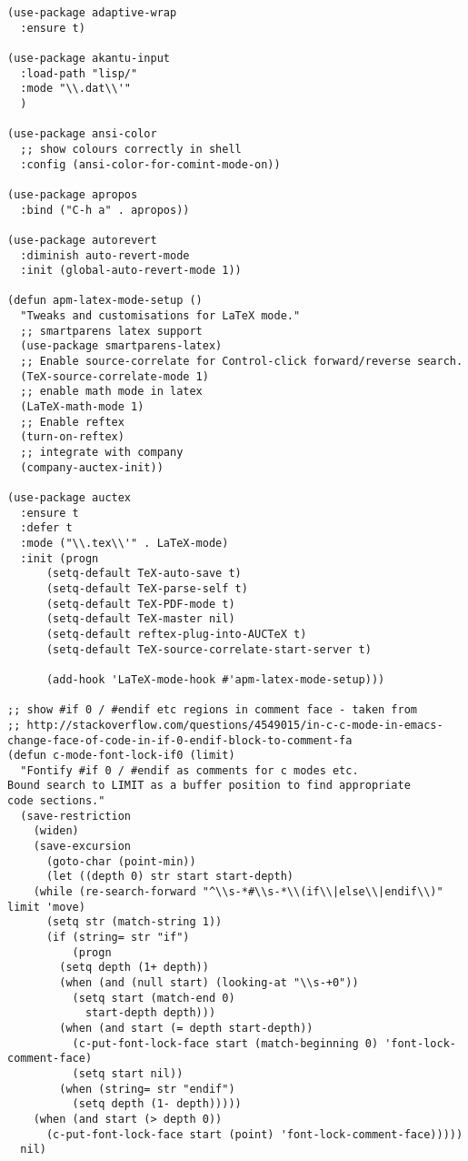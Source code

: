 \documentclass[11pt]{article}
\begin{document}
\begin{verbatim}
(use-package adaptive-wrap
  :ensure t)

(use-package akantu-input
  :load-path "lisp/"
  :mode "\\.dat\\'"
  )

(use-package ansi-color
  ;; show colours correctly in shell
  :config (ansi-color-for-comint-mode-on))

(use-package apropos
  :bind ("C-h a" . apropos))

(use-package autorevert
  :diminish auto-revert-mode
  :init (global-auto-revert-mode 1))

(defun apm-latex-mode-setup ()
  "Tweaks and customisations for LaTeX mode."
  ;; smartparens latex support
  (use-package smartparens-latex)
  ;; Enable source-correlate for Control-click forward/reverse search.
  (TeX-source-correlate-mode 1)
  ;; enable math mode in latex
  (LaTeX-math-mode 1)
  ;; Enable reftex
  (turn-on-reftex)
  ;; integrate with company
  (company-auctex-init))

(use-package auctex
  :ensure t
  :defer t
  :mode ("\\.tex\\'" . LaTeX-mode)
  :init (progn
	  (setq-default TeX-auto-save t)
	  (setq-default TeX-parse-self t)
	  (setq-default TeX-PDF-mode t)
	  (setq-default TeX-master nil)
	  (setq-default reftex-plug-into-AUCTeX t)
	  (setq-default TeX-source-correlate-start-server t)

	  (add-hook 'LaTeX-mode-hook #'apm-latex-mode-setup)))

;; show #if 0 / #endif etc regions in comment face - taken from
;; http://stackoverflow.com/questions/4549015/in-c-c-mode-in-emacs-change-face-of-code-in-if-0-endif-block-to-comment-fa
(defun c-mode-font-lock-if0 (limit)
  "Fontify #if 0 / #endif as comments for c modes etc.
Bound search to LIMIT as a buffer position to find appropriate
code sections."
  (save-restriction
    (widen)
    (save-excursion
      (goto-char (point-min))
      (let ((depth 0) str start start-depth)
	(while (re-search-forward "^\\s-*#\\s-*\\(if\\|else\\|endif\\)" limit 'move)
	  (setq str (match-string 1))
	  (if (string= str "if")
	      (progn
		(setq depth (1+ depth))
		(when (and (null start) (looking-at "\\s-+0"))
		  (setq start (match-end 0)
			start-depth depth)))
	    (when (and start (= depth start-depth))
	      (c-put-font-lock-face start (match-beginning 0) 'font-lock-comment-face)
	      (setq start nil))
	    (when (string= str "endif")
	      (setq depth (1- depth)))))
	(when (and start (> depth 0))
	  (c-put-font-lock-face start (point) 'font-lock-comment-face)))))
  nil)



\end{verbatim}
\end{document}
